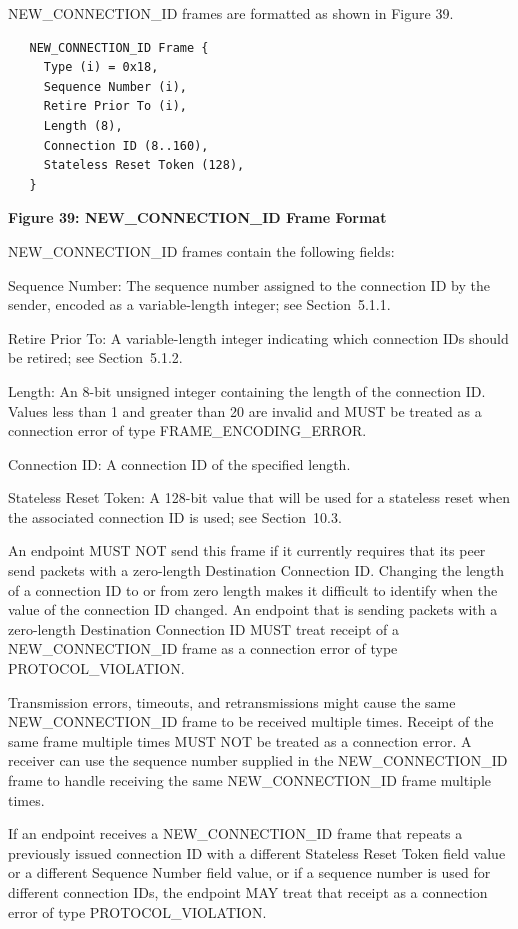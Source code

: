 \documentclass{article}
\begin{document}
NEW\_CONNECTION\_ID frames are formatted as shown in Figure 39.

\begin{verbatim}
   NEW_CONNECTION_ID Frame {
     Type (i) = 0x18,
     Sequence Number (i),
     Retire Prior To (i),
     Length (8),
     Connection ID (8..160),
     Stateless Reset Token (128),
   }
\end{verbatim}

\begin{center}
\textbf{Figure 39: NEW\_CONNECTION\_ID Frame Format}
\end{center}

NEW\_CONNECTION\_ID frames contain the following fields:

Sequence Number:  The sequence number assigned to the connection ID by the sender, encoded as a variable-length integer; see Section~5.1.1.

Retire Prior To:  A variable-length integer indicating which connection IDs should be retired; see Section~5.1.2.

Length:  An 8-bit unsigned integer containing the length of the connection ID.  Values less than 1 and greater than 20 are invalid and MUST be treated as a connection error of type FRAME\_ENCODING\_ERROR.

Connection ID:  A connection ID of the specified length.

Stateless Reset Token:  A 128-bit value that will be used for a stateless reset when the associated connection ID is used; see Section~10.3.

An endpoint MUST NOT send this frame if it currently requires that its peer send packets with a zero-length Destination Connection ID. Changing the length of a connection ID to or from zero length makes it difficult to identify when the value of the connection ID changed. An endpoint that is sending packets with a zero-length Destination Connection ID MUST treat receipt of a NEW\_CONNECTION\_ID frame as a connection error of type PROTOCOL\_VIOLATION.

Transmission errors, timeouts, and retransmissions might cause the same NEW\_CONNECTION\_ID frame to be received multiple times.  Receipt of the same frame multiple times MUST NOT be treated as a connection error.  A receiver can use the sequence number supplied in the NEW\_CONNECTION\_ID frame to handle receiving the same NEW\_CONNECTION\_ID frame multiple times.

If an endpoint receives a NEW\_CONNECTION\_ID frame that repeats a previously issued connection ID with a different Stateless Reset Token field value or a different Sequence Number field value, or if a sequence number is used for different connection IDs, the endpoint MAY treat that receipt as a connection error of type PROTOCOL\_VIOLATION.
\end{document}
